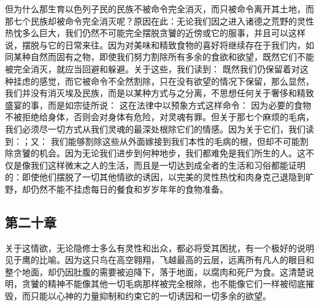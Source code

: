 但为什么那生育以色列子民的民族不被命令完全消灭，而只被命令离开其土地，而那七个民族却被命令完全消灭呢？原因在此：无论我们因之进入诸德之荒野的灵性热忱多么巨大，我们仍然不可能完全摆脱贪饕的近傍或它的服事，并且可以这样说，摆脱与它的日常来往。因为对美味和精致食物的喜好将继续存在于我们内，如同某种自然而固有之物，即使我们努力割除所有多余的食欲和欲望，既然它们不能被完全消灭，就应当回避和躲避。关于这些，我们读到： 既然我们仍保留着对这种挂虑的感觉，而它被命令不全然割除，只在没有欲望的情况下保留，那么显然，我们并没有消灭埃及民族，而是以某种方式与之分离，不思想任何关于奢侈和精致盛宴的事，而是如宗徒所说： 这在法律中以预象方式这样命令： 因为必要的食物不被拒绝给身体，否则会对身体有危险，对灵魂有罪。但关于那七个麻烦的毛病，我们必须尽一切方式从我们灵魂的最深处根除它们的情感。因为关于它们，我们读到：；又： 我们能够割除这些从外面嫁接到我们本性的毛病的根，但却不可能割除贪饕的机会。因为无论我们进步到何种地步，我们都难免是我们所生的人。这不仅是像我们这样微末之人的生活，而且是一切达到成全者的生活和习俗都能证明的：即使他们摆脱了一切其他情欲的诱因，以完美的灵性热忱和肉身克己退隐到旷野，却仍然不能不挂虑每日的餐食和岁岁年年的食物准备。\par


\subsection{第二十章}

\par

关于这情欲，无论隐修士多么有灵性和出众，都必将受其困扰，有一个极好的说明见于鹰的比喻。因为这只鸟在高空翱翔，飞越最高的云层，远离所有凡人的眼目和整个地面，却仍因肚腹的需要被迫降下，落于地面，以腐肉和死尸为食。这清楚说明，贪饕的精神不能像其他一切毛病那样被完全根除，也不能像它们一样被彻底摧毁，而只能以心神的力量抑制和约束它的一切诱因和一切多余的欲望。\par


